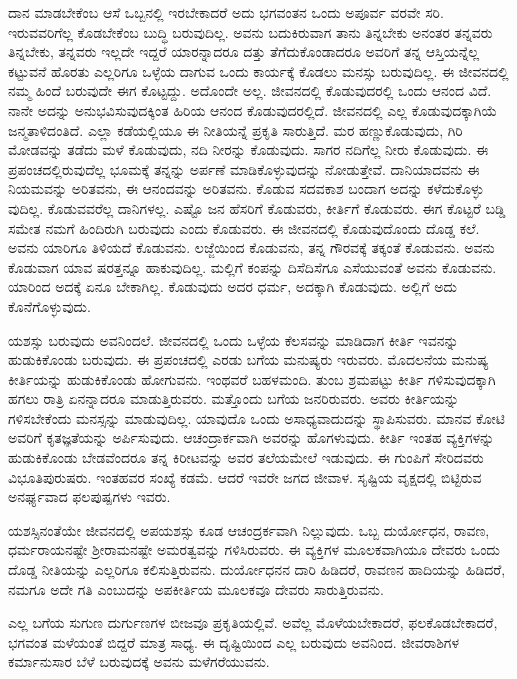 ದಾನ ಮಾಡಬೇಕೆಂಬ ಆಸೆ ಒಬ್ಬನಲ್ಲಿ ಇರಬೇಕಾದರೆ ಅದು ಭಗವಂತನ ಒಂದು ಅಪೂರ್ವ ವರವೇ ಸರಿ. ಇರುವವರಿಗೆಲ್ಲ ಕೊಡಬೇಕೆಂಬ ಬುದ್ಧಿ ಬರುವುದಿಲ್ಲ. ಅವನು ಬದುಕಿರುವಾಗ ತಾನು ತಿನ್ನಬೇಕು ಅನಂತರ ತನ್ನವರು ತಿನ್ನಬೇಕು, ತನ್ನವರು ಇಲ್ಲದೇ ಇದ್ದರೆ ಯಾರನ್ನಾದರೂ ದತ್ತು ತೆಗೆದುಕೊಂಡಾದರೂ ಅವರಿಗೆ ತನ್ನ ಆಸ್ತಿಯನ್ನೆಲ್ಲ ಕಟ್ಟುವನೆ ಹೊರತು ಎಲ್ಲರಿಗೂ ಒಳ್ಳೆಯ ದಾಗುವ ಒಂದು ಕಾರ್ಯಕ್ಕೆ ಕೊಡಲು ಮನಸ್ಸು ಬರುವುದಿಲ್ಲ. ಈ ಜೀವನದಲ್ಲಿ ನಮ್ಮ ಹಿಂದೆ ಬರುವುದೇ ಈಗ ಕೊಟ್ಟದ್ದು. ಅದೊಂದೇ ಅಲ್ಲ. ಜೀವನದಲ್ಲಿ ಕೊಡುವುದರಲ್ಲಿ ಒಂದು ಆನಂದ ವಿದೆ. ನಾನೇ ಅದನ್ನು ಅನುಭವಿಸುವುದಕ್ಕಿಂತ ಹಿರಿಯ ಆನಂದ ಕೊಡುವುದರಲ್ಲಿದೆ. ಜೀವನದಲ್ಲಿ ಎಲ್ಲ ಕೊಡುವುದಕ್ಕಾಗಿಯೆ ಜನ್ಮತಾಳಿದಂತಿದೆ. ಎಲ್ಲಾ ಕಡೆಯಲ್ಲಿಯೂ ಈ ನೀತಿಯನ್ನೆ ಪ್ರಕೃತಿ ಸಾರುತ್ತಿದೆ. ಮರ ಹಣ್ಣುಕೊಡುವುದು, ಗಿರಿ ಮೋಡವನ್ನು ತಡೆದು ಮಳೆ ಕೊಡುವುದು, ನದಿ ನೀರನ್ನು ಕೊಡುವುದು. ಸಾಗರ ನದಿಗೆಲ್ಲ ನೀರು ಕೊಡುವುದು. ಈ ಪ್ರಪಂಚದಲ್ಲಿರುವುದೆಲ್ಲ ಭೂಮಕ್ಕೆ ತನ್ನನ್ನು ಅರ್ಪಣೆ ಮಾಡಿಕೊಳ್ಳುವುದನ್ನು ನೋಡುತ್ತೇವೆ. ದಾನಿಯಾದವನು ಈ ನಿಯಮವನ್ನು ಅರಿತವನು, ಈ ಆನಂದವನ್ನು ಅರಿತವನು. ಕೊಡುವ ಸದವಕಾಶ ಬಂದಾಗ ಅದನ್ನು ಕಳೆದುಕೊಳ್ಳು ವುದಿಲ್ಲ. ಕೊಡುವವರೆಲ್ಲ ದಾನಿಗಳಲ್ಲ. ಎಷ್ಟೊ ಜನ ಹೆಸರಿಗೆ ಕೊಡುವರು, ಕೀರ್ತಿಗೆ ಕೊಡುವರು. ಈಗ ಕೊಟ್ಟರೆ ಬಡ್ಡಿ ಸಮೇತ ನಮಗೆ ಹಿಂದಿರುಗಿ ಬರುವುದು ಎಂದು ಕೊಡುವರು. ಈ ಜೀವನದಲ್ಲಿ ಕೊಡುವುದೊಂದು ದೊಡ್ಡ ಕಲೆ. ಅವನು ಯಾರಿಗೂ ತಿಳಿಯದೆ ಕೊಡುವನು. ಲಜ್ಜೆಯಿಂದ ಕೊಡುವನು, ತನ್ನ ಗೌರವಕ್ಕೆ ತಕ್ಕಂತೆ ಕೊಡುವನು. ಅವನು ಕೊಡುವಾಗ ಯಾವ ಷರತ್ತನ್ನೂ ಹಾಕುವುದಿಲ್ಲ. ಮಲ್ಲಿಗೆ ಕಂಪನ್ನು ದಿಸೆದಿಸೆಗೂ ಎಸೆಯುವಂತೆ ಅವನು ಕೊಡುವನು. ಯಾರಿಂದ ಅದಕ್ಕೆ ಏನೂ ಬೇಕಾಗಿಲ್ಲ. ಕೊಡುವುದು ಅದರ ಧರ್ಮ, ಅದಕ್ಕಾಗಿ ಕೊಡುವುದು. ಅಲ್ಲಿಗೆ ಅದು ಕೊನೆಗೊಳ್ಳುವುದು.

ಯಶಸ್ಸು ಬರುವುದು ಅವನಿಂದಲೆ. ಜೀವನದಲ್ಲಿ ಒಂದು ಒಳ್ಳೆಯ ಕೆಲಸವನ್ನು ಮಾಡಿದಾಗ ಕೀರ್ತಿ ಇವನನ್ನು ಹುಡುಕಿಕೊಂಡು ಬರುವುದು. ಈ ಪ್ರಪಂಚದಲ್ಲಿ ಎರಡು ಬಗೆಯ ಮನುಷ್ಯರು ಇರುವರು. ಮೊದಲನೆಯ ಮನುಷ್ಯ ಕೀರ್ತಿಯನ್ನು ಹುಡುಕಿಕೊಂಡು ಹೋಗುವನು. ಇಂಥವರೆ ಬಹಳಮಂದಿ. ತುಂಬ ಶ್ರಮಪಟ್ಟು ಕೀರ್ತಿ ಗಳಿಸುವುದಕ್ಕಾಗಿ ಹಗಲು ರಾತ್ರಿ ಏನನ್ನಾದರೂ ಮಾಡುತ್ತಿರುವರು. ಮತ್ತೊಂದು ಬಗೆಯ ಜನರಿರುವರು. ಅವರು ಕೀರ್ತಿಯನ್ನು ಗಳಿಸಬೇಕೆಂದು ಮನಸ್ಸನ್ನು ಮಾಡುವುದಿಲ್ಲ. ಯಾವುದೊ ಒಂದು ಅಸಾಧ್ಯವಾದುದನ್ನು ಸ್ಥಾಪಿಸುವರು. ಮಾನವ ಕೋಟಿ ಅವರಿಗೆ ಕೃತಜ್ಞತೆಯನ್ನು ಅರ್ಪಿಸುವುದು. ಆಚಂದ್ರಾರ್ಕವಾಗಿ ಅವರನ್ನು ಹೊಗಳುವುದು. ಕೀರ್ತಿ ಇಂತಹ ವ್ಯಕ್ತಿಗಳನ್ನು ಹುಡುಕಿಕೊಂಡು ಬೇಡವೆಂದರೂ ತನ್ನ ಕಿರೀಟವನ್ನು ಅವರ ತಲೆಯಮೇಲೆ ಇಡುವುದು. ಈ ಗುಂಪಿಗೆ ಸೇರಿದವರು ವಿಭೂತಿಪುರುಷರು. ಇಂತಹವರ ಸಂಖ್ಯೆ ಕಡಮೆ. ಆದರೆ ಇವರೇ ಜಗದ ಜೀವಾಳ. ಸೃಷ್ಟಿಯ ವೃಕ್ಷದಲ್ಲಿ ಬಿಟ್ಟಿರುವ ಅನರ್ಘ್ಯವಾದ ಫಲಪುಷ್ಪಗಳು ಇವರು.

ಯಶಸ್ಸಿನಂತೆಯೇ ಜೀವನದಲ್ಲಿ ಅಪಯಶಸ್ಸು ಕೂಡ ಆಚಂದ್ರರ್ಕವಾಗಿ ನಿಲ್ಲುವುದು. ಒಬ್ಬ ದುರ್ಯೋಧನ, ರಾವಣ, ಧರ್ಮರಾಯನಷ್ಟೇ ಶ‍್ರೀರಾಮನಷ್ಟೇ ಅಮರತ್ವವನ್ನು ಗಳಿಸಿರುವರು. ಈ ವ್ಯಕ್ತಿಗಳ ಮೂಲಕವಾಗಿಯೂ ದೇವರು ಒಂದು ದೊಡ್ಡ ನೀತಿಯನ್ನು ಎಲ್ಲರಿಗೂ ಕಲಿಸುತ್ತಿರುವನು. ದುರ್ಯೋಧನನ ದಾರಿ ಹಿಡಿದರೆ, ರಾವಣನ ಹಾದಿಯನ್ನು ಹಿಡಿದರೆ, ನಮಗೂ ಅದೇ ಗತಿ ಎಂಬುದನ್ನು ಅಪಕೀರ್ತಿಯ ಮೂಲಕವೂ ದೇವರು ಸಾರುತ್ತಿರುವನು.

ಎಲ್ಲ ಬಗೆಯ ಸುಗುಣ ದುರ್ಗುಣಗಳ ಬೀಜವೂ ಪ್ರಕೃತಿಯಲ್ಲಿವೆ. ಅವೆಲ್ಲ ಮೊಳೆಯಬೇಕಾದರೆ, ಫಲಕೊಡಬೇಕಾದರೆ, ಭಗವಂತ ಮಳೆಯಂತೆ ಬಿದ್ದರೆ ಮಾತ್ರ ಸಾಧ್ಯ. ಈ ದೃಷ್ಟಿಯಿಂದ ಎಲ್ಲ ಬರುವುದು ಅವನಿಂದ. ಜೀವರಾಶಿಗಳ ಕರ್ಮಾನುಸಾರ ಬೆಳೆ ಬರುವುದಕ್ಕೆ ಅವನು ಮಳೆಗರೆಯುವನು.

